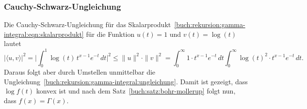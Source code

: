 %
%
\subsubsection{Cauchy-Schwarz-Ungleichung}
Die Cauchy-Schwarz-Ungleichung für das
Skalarprodukt~\eqref{buch:rekursion:gamma-integral:eqn:skalarprodukt}
für die Funktion $u(t)=1$ und $v(t)=\log(t)$
lautet
\[
|\langle u,v\rangle|^2
=
\biggl|
\int_0^1 \log(t)\,t^{x-1}e^{-t}\,dt
\biggr|^2
\le
\|u\|^2\cdot \|v\|^2
=
\int_0^\infty 1\cdot t^{x-1}e^{-t}\,dt
\int_0^\infty \log(t)^2\cdot t^{x-1}e^{-t}\,dt.
\]
Daraus folgt aber durch Umstellen unmittelbar die
Ungleichung~\eqref{buch:rekursion:gamma-integral:ungleichung}.
Damit ist gezeigt, dass $\log f(t)$ konvex ist und nach
dem Satz~\ref{buch:satz:bohr-mollerup} folgt nun, dass $f(x)=\Gamma(x)$.

